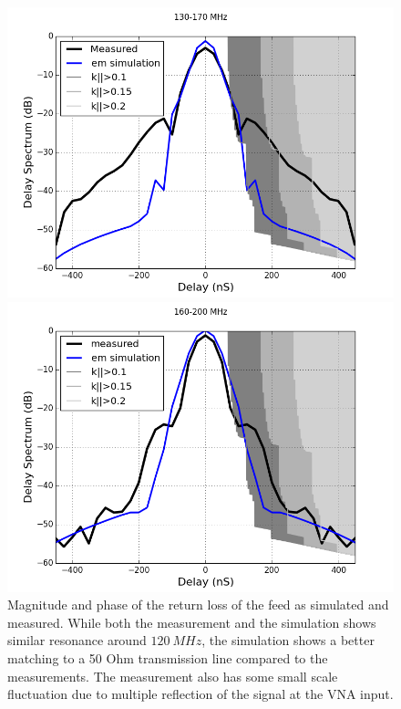\documentclass[twocolumn]{emulateapj}
\begin{document}
\begin{figure}[ht]
\begin{minipage}[b]{0.5\linewidth}
    \centering
    \includegraphics[angle=0, width=\linewidth]{GB_reflectometry_part3/plot/130_170.png}
    \end{minipage}
    \hspace{0.1cm}
    \begin{minipage}[b]{0.5\linewidth}
    \centering
    \includegraphics[angle=0, width=\linewidth]{GB_reflectometry_part3/plot/160_200.png}
    \end{minipage}
    \caption{Magnitude and phase of the return loss of the feed as simulated and measured. While both the measurement and the simulation shows similar resonance around $120~MHz$, the simulation shows a better matching to a 50 Ohm transmission line compared to the measurements. The measurement also has some small scale fluctuation due to multiple reflection of the signal at the VNA input. }   
    \label{ds_full_sub_band}
    \end{figure}
\end{document}
